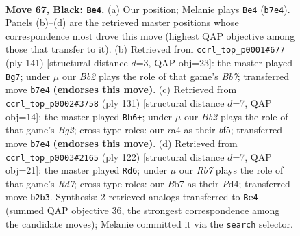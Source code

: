 \documentclass[11pt]{article}
\begin{document}
\clearpage

\begin{figure}[p]\centering
\begin{subfigure}{0.46\textwidth}\centering
\resizebox{\linewidth}{!}{%
\newchessgame
\chessboard[
  setfen={6R1/1b6/3k4/8/RP6/8/1r6/5K2 b - - 8 67},
  showmover=false,
  pgfstyle=straightmove, color=movearrow, markmove={b7-e4}
]}
\caption{}
\end{subfigure}\hfill
\begin{subfigure}{0.46\textwidth}\centering
\resizebox{\linewidth}{!}{%
\newchessgame
\chessboard[
  setfen={8/8/4R1P1/2k5/6r1/8/1b3K2/8 b - - 9 71},
  showmover=false,
  pgfstyle=straightmove, color=movearrow, markmove={b2-g7}
]}
\caption{}
\end{subfigure}
\\[4pt]
\begin{subfigure}{0.46\textwidth}\centering
\resizebox{\linewidth}{!}{%
\newchessgame
\chessboard[
  setfen={8/6b1/6P1/2k2B2/8/4K3/6r1/3R4 b - - 2 66},
  showmover=false,
  pgfstyle=straightmove, color=movearrow, markmove={g7-h6}
]}
\caption{}
\end{subfigure}\hfill
\begin{subfigure}{0.46\textwidth}\centering
\resizebox{\linewidth}{!}{%
\newchessgame
\chessboard[
  setfen={5k2/3R4/8/r2p4/3P4/6K1/8/8 w - - 11 62},
  showmover=false,
  pgfstyle=straightmove, color=movearrow, markmove={d7-d6}
]}
\caption{}
\end{subfigure}
\caption{\textbf{Move 67, Black: \texttt{Be4}.} (a) Our position; Melanie plays \texttt{Be4} (\texttt{b7e4}). Panels (b)--(d) are the retrieved master positions whose correspondence most drove this move (highest QAP objective among those that transfer to it). (b) Retrieved from \texttt{ccrl\_top\_p0001\#677} (ply 141) [structural distance $d$=3, QAP obj=23]: the master played \texttt{Bg7}; under $\mu$ our \emph{Bb2} plays the role of that game's \emph{Bb7}; transferred move \texttt{b7e4} \textbf{(endorses this move)}. (c) Retrieved from \texttt{ccrl\_top\_p0002\#3758} (ply 131) [structural distance $d$=7, QAP obj=14]: the master played \texttt{Bh6+}; under $\mu$ our \emph{Bb2} plays the role of that game's \emph{Bg2}; cross-type roles: our \emph{r}a4 as their \emph{b}f5; transferred move \texttt{b7e4} \textbf{(endorses this move)}. (d) Retrieved from \texttt{ccrl\_top\_p0003\#2165} (ply 122) [structural distance $d$=7, QAP obj=21]: the master played \texttt{Rd6}; under $\mu$ our \emph{Rb7} plays the role of that game's \emph{Rd7}; cross-type roles: our \emph{B}b7 as their \emph{P}d4; transferred move \texttt{b2b3}. Synthesis: 2 retrieved analogs transferred to \texttt{Be4} (summed QAP objective 36, the strongest correspondence among the candidate moves); Melanie committed it via the \texttt{search} selector.}
\label{fig:thought-m133}
\end{figure}
\end{document}
